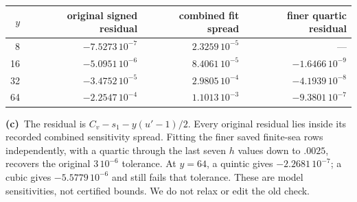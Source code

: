 \documentclass[11pt,a4paper]{article}
\newcommand{\Lc}{\textbf{(c)}\ }
\begin{document}
\begin{center}\small
\begin{tabular}{rrrr}\toprule
$y$ & original signed residual & combined fit spread & finer quartic residual\\\midrule
8 & $-7.5273\,10^{-7}$ & $2.3259\,10^{-5}$ & ---\\
16 & $-5.0951\,10^{-6}$ & $8.4061\,10^{-5}$ & $-1.6466\,10^{-9}$\\
32 & $-3.4752\,10^{-5}$ & $2.9805\,10^{-4}$ & $-4.1939\,10^{-8}$\\
64 & $-2.2547\,10^{-4}$ & $1.1013\,10^{-3}$ & $-9.3801\,10^{-7}$\\\bottomrule
\end{tabular}
\end{center}
\Lc The residual is $C_v-s_1-y(u'-1)/2$. Every original residual lies
inside its recorded combined sensitivity spread. Fitting the finer saved
finite-sea rows independently, with a quartic through the last seven
$h$ values down to $.0025$, recovers the original $3\,10^{-6}$ tolerance.
At $y=64$, a quintic gives $-2.2681\,10^{-7}$; a cubic gives
$-5.5779\,10^{-6}$ and still fails that tolerance. These are model
sensitivities, not certified bounds. We do not relax or edit the old check.
\end{document}
